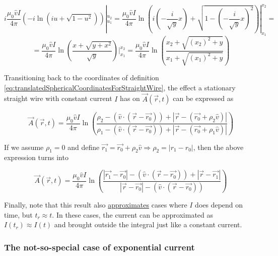 ﻿\documentclass{article}
\begin{document}
\begin{equation*}
    i \frac{\mu_0 \hat{v} I}{4 \pi} (-i\ln(iu + \sqrt{1 - u^2})) |_{u_1}^{u_2} = \frac{\mu_0 \hat{v} I}{4 \pi} \ln \left( i(- \frac{i}{\sqrt{y}} x) + \sqrt{1 - (- \frac{i}{\sqrt{y}} x)^2} \right) |_{x_1}^{x_2} =
\end{equation*}
\begin{equation*}
    = \frac{\mu_0 \hat{v} I}{4 \pi} \ln \left( \frac{x + \sqrt{y + x^2}}{\sqrt{y}} \right) |_{x_1}^{x_2} = \frac{\mu_0 \hat{v} I}{4 \pi} \ln \left( \frac{x_2 + \sqrt{(x_2)^2 + y}}{x_1 + \sqrt{(x_1)^2 + y}} \right)
\end{equation*}

Transitioning back to the coordinates of definition \ref{eq:translatedSphericalCoordinatesForStraightWire}, the effect a stationary straight wire with constant current $I$ has on $\vec{A}(\vec{r}, t)$ can be expressed as

\begin{equation}
    \label{eq:effectOfStationaryStraightWireWithConstantCurrentOnA}
    \vec{A}(\vec{r}, t) = \frac{\mu_0 \hat{v} I}{4 \pi} \ln \left( \frac{\rho_2 - (\hat{v} \cdot (\vec{r} - \vec{r_0})) + |\vec{r} - (\vec{r_0} + \rho_2 \hat{v})|}{\rho_1 - (\hat{v} \cdot (\vec{r} - \vec{r_0})) + |\vec{r} - (\vec{r_0} + \rho_1 \hat{v})|} \right)
\end{equation}

If we assume $\rho_1 = 0$ and define $\vec{r_1} = \vec{r_0} + \rho_2 \hat{v} \Rightarrow \rho_2 = |r_1 - r_0|$, then the above expression turns into

\begin{equation*}
    \vec{A}(\vec{r}, t) = \frac{\mu_0 \hat{v} I}{4 \pi} \ln \left( \frac{|\vec{r_1} - \vec{r_0}| - (\hat{v} \cdot (\vec{r} - \vec{r_0})) + |\vec{r} - \vec{r_1}|}{|\vec{r} - \vec{r_0}| - (\hat{v} \cdot (\vec{r} - \vec{r_0}))} \right)
\end{equation*}

Finally, note that this result also \href{https://en.wikipedia.org/wiki/Approximation}{approximates} cases where $I$ does depend on time, but $t_r \approx t$. In these cases, the current can be approximated as $I(t_r) \approx I(t)$ and brought outside the integral just like a constant current.

\subsubsection{The not-so-special case of exponential current}
\end{document}
